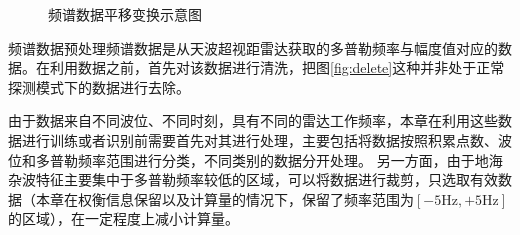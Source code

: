 \begin{figure}[H]
	\centering
	\hfil

	\caption{频谱数据平移变换示意图}
	\label{fig:fft}
\end{figure}

频谱数据预处理频谱数据是从天波超视距雷达获取的多普勒频率与幅度值对应的数据。在利用数据之前，首先对该数据进行清洗，把图\ref{fig:delete}这种并非处于正常探测模式下的数据进行去除。

由于数据来自不同波位、不同时刻，具有不同的雷达工作频率，本章在利用这些数据进行训练或者识别前需要首先对其进行处理，主要包括将数据按照积累点数、波位和多普勒频率范围进行分类，不同类别的数据分开处理。
另一方面，由于地海杂波特征主要集中于多普勒频率较低的区域，可以将数据进行裁剪，只选取有效数据（本章在权衡信息保留以及计算量的情况下，保留了频率范围为$[-5\text{Hz},+5\text{Hz}]$的区域），在一定程度上减小计算量。

